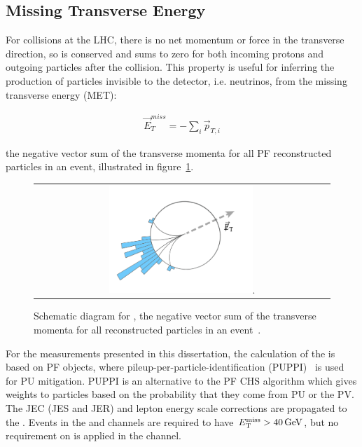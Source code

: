 \subsection{Missing Transverse Energy}
For collisions at the LHC, there is no net momentum or force in the transverse direction, so \pT is conserved and sums to zero for both incoming protons and outgoing particles after the collision.
This property is useful for inferring the production of particles invisible to the detector, i.e. neutrinos, from the missing transverse energy (MET):
\begin{linenomath*}
\begin{align}
\vec{E}_T^{miss}=-\sum_{i} \vec{p}_{T,i}
\end{align}
\end{linenomath*}
the negative vector sum of the transverse momenta for all PF reconstructed particles in an event, illustrated in figure~\ref{met_schematic}.
\begin{figure}[htb]
  \begin{center}
    \begin{tabular}{c}
        \includegraphics[width=0.5\textwidth]{fig_Event_Reconstruction/met_schematic.pdf}.
    \end{tabular}
    \caption{Schematic diagram for \MET, the negative vector sum of the transverse momenta for all reconstructed particles in an event~\cite{METSchematicDiagram}.
            }
    \label{met_schematic}
  \end{center}
\end{figure}

For the measurements presented in this dissertation, the calculation of the \ETmiss is based on PF objects, where pileup-per-particle-identification (PUPPI)~\cite{bib:PUPPI} is used for PU mitigation.
PUPPI is an alternative to the PF CHS algorithm which gives weights to particles based on the probability that they come from PU or the PV.
The JEC (JES and JER) and lepton energy scale corrections are propagated to the \ETmiss.
Events in the \ee and \mumu channels are required to have $\ETmiss > \SI{40}{\GeV}$, but no requirement on \ETmiss is applied in the \emu channel.

